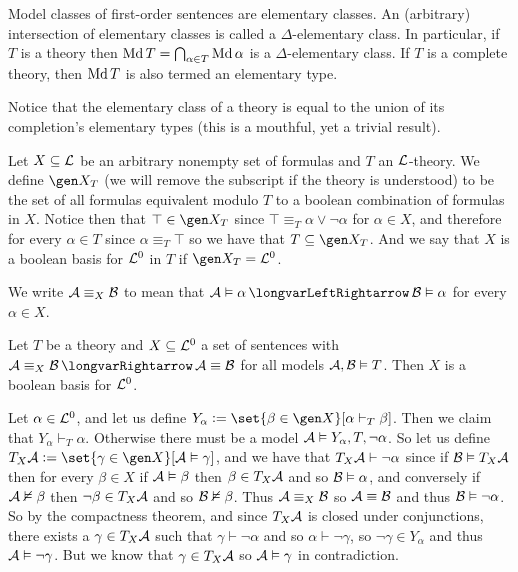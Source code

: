 \bdefn

    Model classes of first-order sentences are {\emphcolor elementary classes}.
    An (arbitrary) intersection of elementary classes is called a {\emphcolor $\Delta$-elementary class}.
    In particular, if $T$ is a theory then $\mathop{\rm Md} T=\bigcap_{\alpha\in T}\mathop{\rm Md}\alpha$ is a $\Delta$-elementary class.
    If $T$ is a complete theory, then $\mathop{\rm Md} T$ is also termed an {\emphcolor elementary type}.

\edefn

Notice that the elementary class of a theory is equal to the union of its completion's elementary types (this is a mouthful, yet a trivial result).

\bdefn

    Let $X\subseteq{\cal L}$ be an arbitrary nonempty set of formulas and $T$ an ${\cal L}$-theory.
    We define $\gen X_T$ (we will remove the subscript if the theory is understood) to be the set of all formulas equivalent modulo $T$ to a boolean combination of formulas in $X$.
    Notice then that $\top\in\gen X_T$ since $\top\equiv_T\alpha\lor\neg\alpha$ for $\alpha\in X$, and therefore for every $\alpha\in T$ since $\alpha\equiv_T\top$ so we have that $T\subseteq\gen X_T$.
    And we say that $X$ is a {\emphcolor boolean basis for ${\cal L}^0$ in $T$} if $\gen X_T={\cal L}^0$.

\edefn

We write ${\cal A}\equiv_X{\cal B}$ to mean that ${\cal A}\vDash\alpha\iff{\cal B}\vDash\alpha$ for every $\alpha\in X$.

\bthrm[title=Basis Theorem for Sentences, name=basistheorem]

    Let $T$ be a theory and $X\subseteq{\cal L}^0$ a set of sentences with ${\cal A}\equiv_X{\cal B}\implies{\cal A}\equiv{\cal B}$ for all models ${\cal A},{\cal B}\vDash T$.
    Then $X$ is a boolean basis for ${\cal L}^0$.

\ethrm

Let $\alpha\in{\cal L}^0$, and let us define $Y_\alpha\coloneqq\set{\beta\in\gen X}[\alpha\vdash_T\beta]$.
Then we claim that $Y_\alpha\vdash_T\alpha$.
Otherwise there must be a model ${\cal A}\vDash Y_\alpha,T,\neg\alpha$.
So let us define $T_X{\cal A}\coloneqq\set{\gamma\in\gen X}[{\cal A}\vDash\gamma]$, and we have that $T_X{\cal A}\vdash\neg\alpha$ since if ${\cal B}\vDash T_X{\cal A}$ then for every $\beta\in X$ if
${\cal A}\vDash\beta$ then $\beta\in T_X{\cal A}$ and so ${\cal B}\vDash\alpha$, and conversely if ${\cal A}\nvDash\beta$ then $\neg\beta\in T_X{\cal A}$ and so ${\cal B}\nvDash\beta$.
Thus ${\cal A}\equiv_X{\cal B}$ so ${\cal A}\equiv{\cal B}$ and thus ${\cal B}\vDash\neg\alpha$.
So by the compactness theorem, and since $T_X{\cal A}$ is closed under conjunctions, there exists a $\gamma\in T_X{\cal A}$ such that $\gamma\vdash\neg\alpha$ and so $\alpha\vdash\neg\gamma$, so
$\neg\gamma\in Y_\alpha$ and thus ${\cal A}\vDash\neg\gamma$.
But we know that $\gamma\in T_X{\cal A}$ so ${\cal A}\vDash\gamma$ in contradiction.


